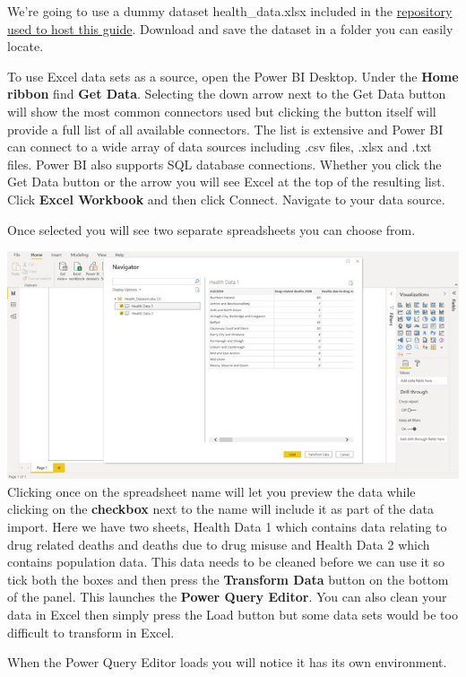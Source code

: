 \documentclass[
]{book}
\begin{document}
We're going to use a dummy dataset health\_data.xlsx included in the \href{https://github.com/aamcmurray/BookTest/blob/main/health_data.xlsx}{repository used to host this guide}. Download and save the dataset in a folder you can easily locate.

To use Excel data sets as a source, open the Power BI Desktop. Under the \textbf{Home ribbon} find \textbf{Get Data}. Selecting the down arrow next to the Get Data button will show the most common connectors used but clicking the button itself will provide a full list of all available connectors. The list is extensive and Power BI can connect to a wide array of data sources including .csv files, .xlsx and .txt files. Power BI also supports SQL database connections. Whether you click the Get Data button or the arrow you will see Excel at the top of the resulting list. Click \textbf{Excel Workbook} and then click Connect. Navigate to your data source.

Once selected you will see two separate spreadsheets you can choose from.

\includegraphics{bi2.jpg}
Clicking once on the spreadsheet name will let you preview the data while clicking on the \textbf{checkbox} next to the name will include it as part of the data import. Here we have two sheets, Health Data 1 which contains data relating to drug related deaths and deaths due to drug misuse and Health Data 2 which contains population data. This data needs to be cleaned before we can use it so tick both the boxes and then press the \textbf{Transform Data} button on the bottom of the panel. This launches the \textbf{Power Query Editor}. You can also clean your data in Excel then simply press the Load button but some data sets would be too difficult to transform in Excel.

When the Power Query Editor loads you will notice it has its own environment.
\end{document}
